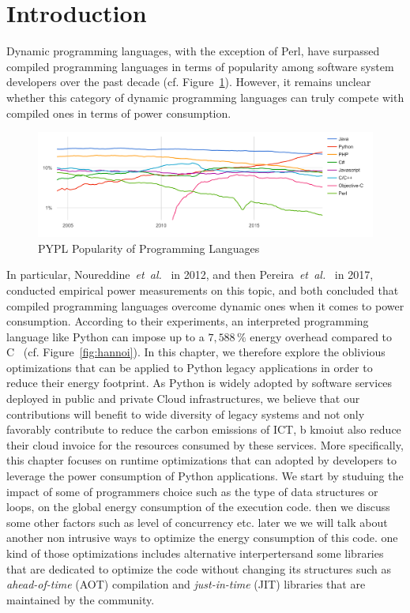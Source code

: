 
\section{Introduction}


Dynamic programming languages, with the exception of Perl, have surpassed compiled programming languages in terms of popularity among software system developers over the past decade (cf. Figure~\ref{fig:pypl}).
However, it remains unclear whether this category of dynamic programming languages can truly compete with compiled ones in terms of power consumption.
\begin{figure}[htbp]
    \includegraphics[width=\linewidth]{imgs/programminglanguangespopularity.png}
    \caption{PYPL Popularity of Programming Languages~\cite{noauthor_pypl_nodate}}
    \label{fig:pypl}
\end{figure}

In particular, Noureddine~\emph{et~al.}~\cite{noureddine_preliminary_2012} in 2012, and then Pereira~\emph{et~al.}~\cite{pereira_energy_2017} in 2017, conducted empirical power measurements on this topic, and both concluded that compiled programming languages overcome dynamic ones when it comes to power consumption.
According to their experiments, an interpreted programming language like Python can impose up to a $7,588\,\%$ energy overhead compared to C~\cite{pereira_energy_2017} (cf. Figure~\ref{fig:hannoi}).
In this chapter, we therefore explore the oblivious optimizations that can be applied to Python legacy applications in order to reduce their energy footprint.
As Python is widely adopted by software services deployed in public and private Cloud infrastructures, we believe that our contributions will benefit to wide diversity of legacy systems and not only favorably contribute to reduce the carbon emissions of ICT, b kmoiut also reduce their cloud invoice for the resources consumed by these services.
More specifically, this chapter focuses on runtime optimizations that can adopted by developers to leverage the power consumption of Python applications.
We start by studuing the impact of some of programmers choice such as the type of data structures or loops, on the global energy consumption of the execution code.
then we discuss some other factors such as level of concurrency etc. later we we will talk about another non intrusive ways to optimize the energy consumption of this code. one kind of those optimizations includes alternative interpertersand some libraries that are dedicated to optimize the code without changing its structures such as \emph{ahead-of-time} (AOT) compilation and \emph{just-in-time} (JIT) libraries that are maintained by the community.

